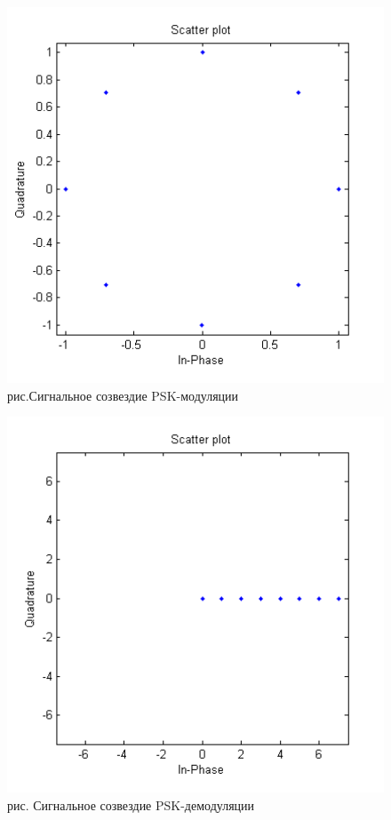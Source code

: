\documentclass[10pt,a4paper]{report}
\begin{document}
\begin{figure}
\begin{center}
\includegraphics[width=150mm, scale = 0.9]{9_3}\newline
рис.Сигнальное созвездие PSK-модуляции\newline
\end{center}
\end{figure}
\begin{figure}
\begin{center}
\includegraphics[width=150mm, scale = 0.9]{9_4}\newline
рис. Сигнальное созвездие PSK-демодуляции\newline
\end{center}
\end{figure}
\end{document}
